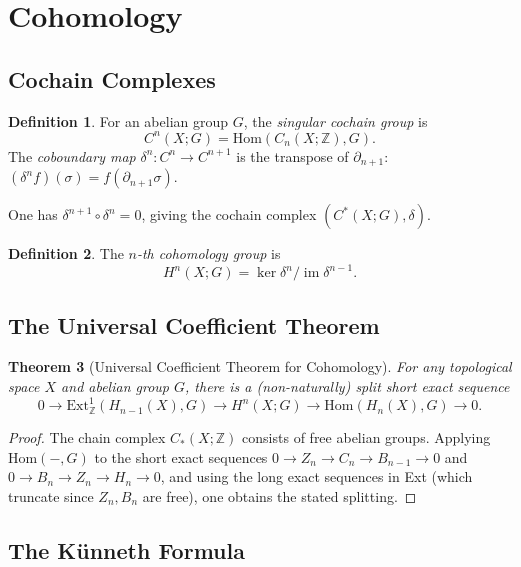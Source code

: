 \documentclass[12pt,a4paper]{amsart}
\newtheorem{theorem}{Theorem}[section]
\theoremstyle{definition}
\newtheorem{definition}[theorem]{Definition}
\begin{document}
\section{Cohomology}
\label{sec:cohomology}

\subsection{Cochain Complexes}

\begin{definition}
For an abelian group $G$, the \emph{singular cochain group} is
\[
  C^n(X; G) = \mathrm{Hom}(C_n(X;\mathbb{Z}), G).
\]
The \emph{coboundary map} $\delta^n\colon C^n \to C^{n+1}$ is the
transpose of $\partial_{n+1}$: $(\delta^n f)(\sigma) = f(\partial_{n+1}\sigma)$.
\end{definition}

One has $\delta^{n+1} \circ \delta^n = 0$, giving the cochain complex
$(C^*(X;G), \delta)$.

\begin{definition}
The \emph{$n$-th cohomology group} is
\[
  H^n(X; G) = \ker \delta^n / \operatorname{im} \delta^{n-1}.
\]
\end{definition}

\subsection{The Universal Coefficient Theorem}

\begin{theorem}[Universal Coefficient Theorem for Cohomology]
\label{thm:uct}
For any topological space $X$ and abelian group $G$, there is a (non-naturally)
split short exact sequence
\[
  0 \to \mathrm{Ext}^1_\mathbb{Z}(H_{n-1}(X), G)
  \to H^n(X; G)
  \to \mathrm{Hom}(H_n(X), G)
  \to 0.
\]
\end{theorem}
\begin{proof}
The chain complex $C_*(X;\mathbb{Z})$ consists of free abelian groups. Applying
$\mathrm{Hom}(-,G)$ to the short exact sequences
$0 \to Z_n \to C_n \to B_{n-1} \to 0$ and $0 \to B_n \to Z_n \to H_n \to 0$,
and using the long exact sequences in Ext (which truncate since $Z_n, B_n$ are
free), one obtains the stated splitting.
\end{proof}

\subsection{The K\"unneth Formula}
\end{document}
